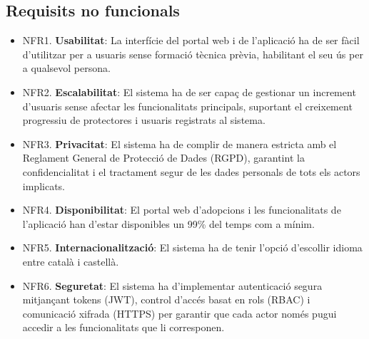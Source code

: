 \documentclass[11pt,a4paper]{report}
\begin{document}
\subsection{Requisits no funcionals}
\begin{itemize}
    \item NFR1. \textbf{Usabilitat}: La interfície del portal web i de l’aplicació ha de ser fàcil d’utilitzar per a usuaris sense formació tècnica prèvia, habilitant el seu ús per a qualsevol persona.
    \item NFR2. \textbf{Escalabilitat}: El sistema ha de ser capaç de gestionar un increment d’usuaris sense afectar les funcionalitats principals, suportant el creixement progressiu de protectores i usuaris registrats al sistema.
    \item NFR3. \textbf{Privacitat}: El sistema ha de complir de manera estricta amb el Reglament General de Protecció de Dades (RGPD), garantint la confidencialitat i el tractament segur de les dades personals de tots els actors implicats.
    \item NFR4. \textbf{Disponibilitat}: El portal web d’adopcions i les funcionalitats de l’aplicació han d’estar disponibles un 99\% del temps com a mínim.
    \item NFR5. \textbf{Internacionalització}: El sistema ha de tenir l’opció d’escollir idioma entre català i castellà.
    \item NFR6. \textbf{Seguretat}: El sistema ha d'implementar autenticació segura mitjançant tokens (JWT), control d'accés basat en rols (RBAC) i comunicació xifrada (HTTPS) per garantir que cada actor només pugui accedir a les funcionalitats que li corresponen.
\end{itemize}
\end{document}

